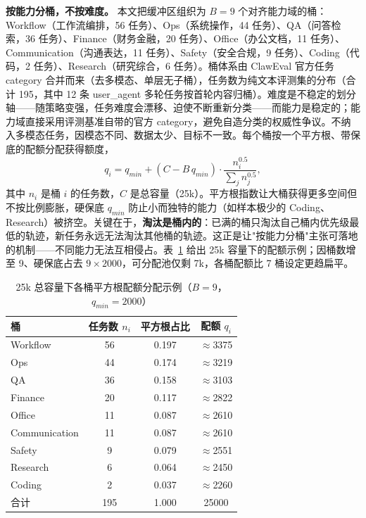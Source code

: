 \textbf{按能力分桶，不按难度。} 本文把缓冲区组织为 $B=9$ 个对齐能力域的桶：Workflow（工作流编排，56 任务）、Ops（系统操作，44 任务）、QA（问答检索，36 任务）、Finance（财务金融，20 任务）、Office（办公文档，11 任务）、Communication（沟通表达，11 任务）、Safety（安全合规，9 任务）、Coding（代码，2 任务）、Research（研究综合，6 任务）。桶体系由 ClawEval 官方任务 category 合并而来（去多模态、单层无子桶），任务数为纯文本评测集的分布（合计 195，其中 12 条 user\_agent 多轮任务按首轮内容归桶）。难度是不稳定的划分轴——随策略变强，任务难度会漂移、迫使不断重新分类——而能力是稳定的；能力域直接采用评测基准自带的官方 category，避免自造分类的权威性争议。不纳入多模态任务，因模态不同、数据太少、目标不一致。每个桶按一个平方根、带保底的配额分配获得额度，
\begin{equation}
\label{eq:quota}
q_i = q_{min} + (C - B\,q_{min})\cdot \frac{n_i^{0.5}}{\sum_j n_j^{0.5}},
\end{equation}
其中 $n_i$ 是桶 $i$ 的任务数，$C$ 是总容量（25k）。平方根指数让大桶获得更多空间但不按比例膨胀，硬保底 $q_{min}$ 防止小而独特的能力（如样本极少的 Coding、Research）被挤空。关键在于，\textbf{淘汰是桶内的}：已满的桶只淘汰自己桶内优先级最低的轨迹，新任务永远无法淘汰其他桶的轨迹。这正是让"按能力分桶"主张可落地的机制——不同能力无法互相侵占。表~\ref{tab:quota} 给出 25k 容量下的配额示例；因桶数增至 9、硬保底占去 $9\times2000$，可分配池仅剩 7k，各桶配额比 7 桶设定更趋扁平。

\begin{table}[htbp]
\centering
\caption{25k 总容量下各桶平方根配额分配示例（$B=9$，$q_{min}=2000$）}
\label{tab:quota}
\begin{tabular}{lccc}
\toprule[1.5pt]
桶 & 任务数 $n_i$ & 平方根占比 & 配额 $q_i$ \\
\midrule[1pt]
Workflow & 56 & 0.197 & $\approx$3375 \\
Ops & 44 & 0.174 & $\approx$3219 \\
QA & 36 & 0.158 & $\approx$3103 \\
Finance & 20 & 0.117 & $\approx$2822 \\
Office & 11 & 0.087 & $\approx$2610 \\
Communication & 11 & 0.087 & $\approx$2610 \\
Safety & 9 & 0.079 & $\approx$2551 \\
Research & 6 & 0.064 & $\approx$2450 \\
Coding & 2 & 0.037 & $\approx$2260 \\
\midrule
合计 & 195 & 1.000 & 25000 \\
\bottomrule[1.5pt]
\end{tabular}
\end{table}

